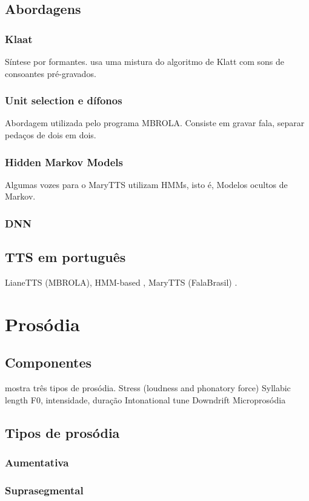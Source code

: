 \subsection{Abordagens}
\subsubsection{Klaat}
Síntese por formantes. \cite{espeakng} usa uma mistura do algoritmo de Klatt com
sons de consoantes pré-gravados.
\subsubsection{Unit selection e dífonos}
Abordagem utilizada pelo programa MBROLA. Consiste em gravar fala, separar
pedaços de dois em dois.
\subsubsection{Hidden Markov Models}
Algumas vozes para o MaryTTS \cite{marytts} utilizam HMMs, isto é, Modelos ocultos de Markov.
\subsubsection{DNN}
\subsection{TTS em português}
LianeTTS (MBROLA), HMM-based \cite{couto}, MaryTTS (FalaBrasil) \cite{falabrasil}.
\section{Prosódia}
\subsection{Componentes}
 mostra três tipos de prosódia.
Stress (loudness and phonatory force)
Syllabic length
F0, intensidade, duração
Intonational tune
Downdrift
Microprosódia
\subsection{Tipos de prosódia}
\subsubsection{Aumentativa}
\subsubsection{Suprasegmental}
